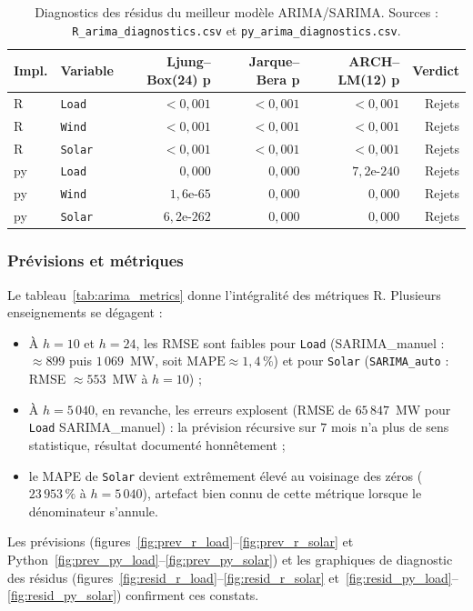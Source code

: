 \begin{table}[H]
\centering
\caption{Diagnostics des résidus du meilleur modèle ARIMA/SARIMA.
Sources : \texttt{R\_arima\_diagnostics.csv} et \texttt{py\_arima\_diagnostics.csv}.}
\label{tab:arima_diag}
\small
\begin{tabular}{llrrrr}
\toprule
Impl. & Variable & Ljung--Box(24) p & Jarque--Bera p & ARCH--LM(12) p & Verdict \\
\midrule
R  & \texttt{Load}  & $<0{,}001$ & $<0{,}001$ & $<0{,}001$ & Rejets \\
R  & \texttt{Wind}  & $<0{,}001$ & $<0{,}001$ & $<0{,}001$ & Rejets \\
R  & \texttt{Solar} & $<0{,}001$ & $<0{,}001$ & $<0{,}001$ & Rejets \\
py & \texttt{Load}  & $0{,}000$ & $0{,}000$ & $7{,}2\text{e-}240$ & Rejets \\
py & \texttt{Wind}  & $1{,}6\text{e-}65$ & $0{,}000$ & $0{,}000$ & Rejets \\
py & \texttt{Solar} & $6{,}2\text{e-}262$ & $0{,}000$ & $0{,}000$ & Rejets \\
\bottomrule
\end{tabular}
\end{table}

\subsubsection{Prévisions et métriques}
Le tableau~\ref{tab:arima_metrics} donne l'intégralité des métriques R.
Plusieurs enseignements se dégagent :
\begin{itemize}
  \item À \(h=10\) et \(h=24\), les RMSE sont faibles pour \texttt{Load}
        (SARIMA\_manuel : \(\approx 899\) puis \(1\,069\)~MW, soit
        \(\text{MAPE}\approx 1{,}4\,\%\)) et pour \texttt{Solar}
        (\texttt{SARIMA\_auto} : RMSE \(\approx 553\)~MW à \(h=10\)) ;
  \item À \(h=5\,040\), en revanche, les erreurs explosent (RMSE de
        \(65\,847\)~MW pour \texttt{Load} SARIMA\_manuel) : la prévision
        récursive sur \(7\) mois n'a plus de sens statistique, résultat
        documenté honnêtement ;
  \item le MAPE de \texttt{Solar} devient extrêmement élevé au voisinage des
        zéros (\(23\,953\,\%\) à \(h=5\,040\)), artefact bien connu de cette
        métrique lorsque le dénominateur s'annule.
\end{itemize}
Les prévisions (figures~\ref{fig:prev_r_load}--\ref{fig:prev_r_solar} et
Python~\ref{fig:prev_py_load}--\ref{fig:prev_py_solar}) et les graphiques de
diagnostic des résidus (figures~\ref{fig:resid_r_load}--\ref{fig:resid_r_solar}
et~\ref{fig:resid_py_load}--\ref{fig:resid_py_solar}) confirment ces
constats.

